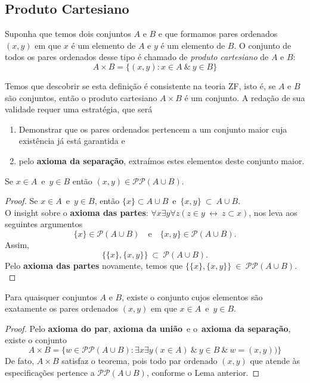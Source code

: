    \subsection{Produto Cartesiano}
      \begin{definition}
         Suponha que temos dois conjuntos $A$ e $B$ e que formamos pares ordenados $( x , y ) $ em que $x$ é um elemento de $A$ e $y$ é um elemento de $B$. O conjunto de todos os pares ordenados desse tipo é chamado de \emph{produto cartesiano} de $A$ e $B$:
         $$A \times B = \{( x, y ) : x \in A\ \&\ y \in B \}$$
      \end{definition}
      Temos que descobrir se esta definição é consistente na teoria ZF, isto é, se $A$ e $B$ são conjuntos, então o produto cartesiano $A \times B$ é um conjunto. A redação de sua validade requer uma estratégia, que será
      \begin{enumerate}
         \item Demonstrar que os pares ordenados pertencem a um conjunto maior cuja existência já está garantida e
         \item pelo \textbf{axioma da separação}, extraímos estes elementos deste conjunto maior.
      \end{enumerate}
      \begin{lemma}
         Se $x \in A$\ e\ $y \in B$ então $( x, y ) \in \mathcal{P}\mathcal{P}(A \cup B).$
         \begin{proof}
            Se $x \in A$\ e\ $y \in B$, então $\{x\} \subset A \cup B$\ e\ $\{x, y\}\ \subset\ A \cup B$.\\
            O insight sobre o \textbf{axioma das partes}: $\forall x \exists y \forall z (z \in y\ \leftrightarrow\ z \subset x)$, nos leva aos seguintes argumentos
            $$\{x\} \in \mathcal{P}(A \cup B) \quad \textrm{e}\quad \{x, y\} \in \mathcal{P}(A \cup B).$$
            Assim, $$\{\{x\},\{x, y\}\}\ \subset\ \mathcal{P}(A \cup B).$$
            Pelo \textbf{axioma das partes} novamente, temos que $\{\{x\},\{x, y\}\}\ \in\ \mathcal{P}\mathcal{P}(A \cup B).$
         \end{proof}
      \end{lemma}
      \begin{corollary}
         Para quaisquer conjuntos $A$ e $B$, existe o conjunto cujos elementos são exatamente os pares ordenados $( x, y )$ em que $x \in A$\ e\ $y \in B$.
         \begin{proof}
            Pelo \textbf{axioma do par}, \textbf{axioma da união}\ e o\ \textbf{axioma da separação}, existe o conjunto
            $$ A \times B = \{w \in \mathcal{P}\mathcal{P}(A \cup B): \exists x \exists y (x \in A)\ \&\ y \in B\ \&\ w = ( x, y ))\}$$
            De fato, $A \times B$ satisfaz o teorema, pois todo par ordenado $( x, y )$ que atende às especificações pertence a $\mathcal{P}\mathcal{P}(A \cup B)$, conforme o Lema anterior.
         \end{proof}
      \end{corollary}

